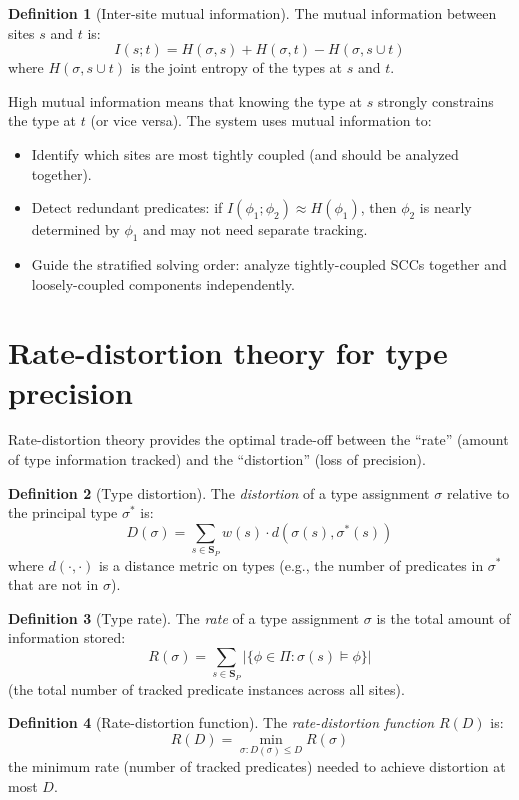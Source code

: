 \documentclass[11pt]{report}
\theoremstyle{definition}
\newtheorem{definition}{Definition}[section]
\theoremstyle{plain}
\begin{document}
\begin{definition}[Inter-site mutual information]
The mutual information between sites $s$ and $t$ is:
\[
  I(s; t) = H(\sigma, s) + H(\sigma, t) - H(\sigma, s \cup t)
\]
where $H(\sigma, s \cup t)$ is the joint entropy of the types at $s$ and $t$.
\end{definition}

High mutual information means that knowing the type at $s$ strongly
constrains the type at $t$ (or vice versa). The system uses mutual
information to:
\begin{itemize}[nosep]
  \item Identify which sites are most tightly coupled (and should be analyzed
        together).
  \item Detect redundant predicates: if $I(\phi_1; \phi_2) \approx
        H(\phi_1)$, then $\phi_2$ is nearly determined by $\phi_1$ and may
        not need separate tracking.
  \item Guide the stratified solving order: analyze tightly-coupled SCCs
        together and loosely-coupled components independently.
\end{itemize}

\section{Rate-distortion theory for type precision}

Rate-distortion theory provides the optimal trade-off between the ``rate''
(amount of type information tracked) and the ``distortion'' (loss of
precision).

\begin{definition}[Type distortion]
The \emph{distortion} of a type assignment $\sigma$ relative to the
principal type $\sigma^*$ is:
\[
  D(\sigma) = \sum_{s \in \mathbf{S}_P} w(s) \cdot
    d(\sigma(s), \sigma^*(s))
\]
where $d(\cdot, \cdot)$ is a distance metric on types (e.g., the number of
predicates in $\sigma^*$ that are not in $\sigma$).
\end{definition}

\begin{definition}[Type rate]
The \emph{rate} of a type assignment $\sigma$ is the total amount of
information stored:
\[
  R(\sigma) = \sum_{s \in \mathbf{S}_P} |\{\phi \in \Pi :
    \sigma(s) \models \phi\}|
\]
(the total number of tracked predicate instances across all sites).
\end{definition}

\begin{definition}[Rate-distortion function]
The \emph{rate-distortion function} $R(D)$ is:
\[
  R(D) = \min_{\sigma : D(\sigma) \leq D} R(\sigma)
\]
the minimum rate (number of tracked predicates) needed to achieve distortion
at most $D$.
\end{definition}
\end{document}
